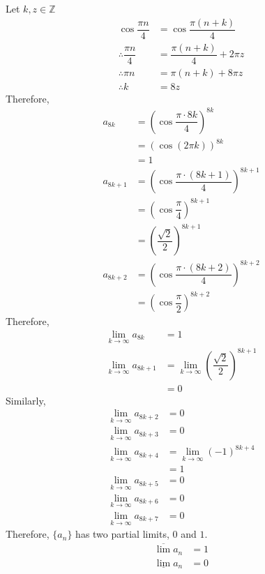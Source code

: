 \documentclass[fleqn, a4paper, 12pt, twoside]{article}
\theoremstyle{definition}
\theoremstyle{theorem}
\begin{document}
\begin{solution}
	Let $k, z \in \mathbb{Z}$
	\begin{align*}
		\cos \dfrac{\pi n}{4} &= \cos \dfrac{\pi (n + k)}{4}\\
		\therefore \dfrac{\pi n}{4} &= \dfrac{\pi (n + k)}{4} + 2 \pi z\\
		\therefore \pi n &= \pi (n + k) + 8 \pi z\\
		\therefore k &= 8 z
	\end{align*}
	Therefore,
	\begin{align*}
		a_{8k} &= \left( \cos \dfrac{\pi \cdot 8k}{4} \right)^{8k}\\
		&= \left( \cos (2 \pi k) \right)^{8k}\\
		&= 1\\
		a_{8k + 1} &= \left( \cos \dfrac{\pi \cdot (8k + 1)}{4} \right)^{8k + 1}\\
		&= \left( \cos \dfrac{\pi}{4} \right)^{8k + 1}\\
		&= \left( \dfrac{\sqrt{2}}{2} \right)^{8k + 1}\\
		a_{8k + 2} &= \left( \cos \dfrac{\pi \cdot (8k + 2)}{4} \right)^{8k + 2}\\
		&= \left( \cos \dfrac{\pi}{2} \right)^{8k + 2}
	\end{align*}
	Therefore,
	\begin{align*}
		\lim\limits_{k \to \infty} a_{8k} &= 1\\
		\lim\limits_{k \to \infty} a_{8k + 1} &= \lim\limits_{k \to \infty} \left( \dfrac{\sqrt{2}}{2} \right)^{8k + 1}\\
		&= 0
	\end{align*}
	Similarly,
	\begin{align*}
		\lim\limits_{k \to \infty} a_{8k + 2} &= 0\\
		\lim\limits_{k \to \infty} a_{8k + 3} &= 0\\
		\lim\limits_{k \to \infty} a_{8k + 4} &= \lim\limits_{k \to \infty} (-1)^{8k + 4}\\
		&= 1\\
		\lim\limits_{k \to \infty} a_{8k + 5} &= 0\\
		\lim\limits_{k \to \infty} a_{8k + 6} &= 0\\
		\lim\limits_{k \to \infty} a_{8k + 7} &= 0
	\end{align*}
	Therefore, $\{a_n\}$ has two partial limits, $0$ and $1$.
	\begin{align*}
		\overline{\lim} a_n &= 1\\
		\underline{\lim} a_n &= 0
	\end{align*}
\end{solution}
\end{document}
